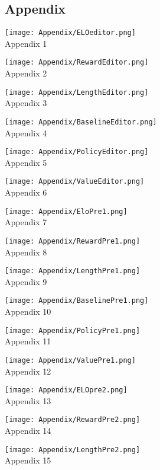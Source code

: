\documentclass{LSkill}
\begin{document}
\begin{appendix}

\section{Appendix}
\texttt{[image: Appendix/ELOeditor.png]}\\
Appendix 1

\texttt{[image: Appendix/RewardEditor.png]}\\
Appendix 2

\texttt{[image: Appendix/LengthEditor.png]}\\
Appendix 3

\texttt{[image: Appendix/BaselineEditor.png]}\\
Appendix 4

\texttt{[image: Appendix/PolicyEditor.png]}\\
Appendix 5

\texttt{[image: Appendix/ValueEditor.png]}\\
Appendix 6

\texttt{[image: Appendix/EloPre1.png]}\\
Appendix 7

\texttt{[image: Appendix/RewardPre1.png]}\\
Appendix 8

\texttt{[image: Appendix/LengthPre1.png]}\\
Appendix 9

\texttt{[image: Appendix/BaselinePre1.png]}\\
Appendix 10

\texttt{[image: Appendix/PolicyPre1.png]}\\
Appendix 11

\texttt{[image: Appendix/ValuePre1.png]}\\
Appendix 12

\texttt{[image: Appendix/ELOpre2.png]}\\
Appendix 13

\texttt{[image: Appendix/RewardPre2.png]}\\
Appendix 14

\texttt{[image: Appendix/LengthPre2.png]}\\
Appendix 15


\end{appendix}
\end{document}
